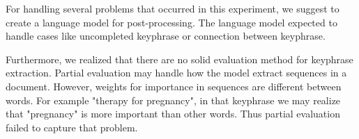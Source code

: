 For handling several problems that occurred in this experiment, we suggest to create a language model for post-processing. The language model expected to handle cases like uncompleted keyphrase or connection between keyphrase.

Furthermore, we realized that there are no solid evaluation method for keyphrase extraction. Partial evaluation may handle how the model extract sequences in a document. However, weights for importance in sequences are different between words. For example "therapy for pregnancy", in that keyphrase we may realize that "pregnancy" is more important than other words. Thus partial evaluation failed to capture that problem.
\fi